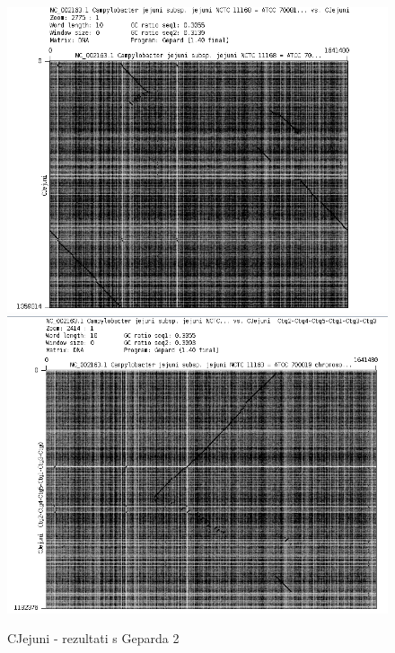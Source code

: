 \begin{figure}[H]
    \centering
    \includegraphics[scale=0.5]{img/Grah10.png}
    \includegraphics[scale=0.5]{img/Grah1.png}
    \caption{CJejuni - rezultati s Geparda 2}
    \label{fig:cjejuni2}
\end{figure}

